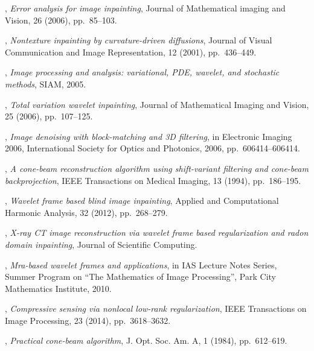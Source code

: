 \documentclass[letterpaper,10pt]{article}
\begin{document}
\begin{thebibliography}{10}
, {\em Error analysis for image inpainting},
  Journal of Mathematical imaging and Vision, 26 (2006), pp.~85--103.

, {\em Nontexture inpainting by curvature-driven
  diffusions}, Journal of Visual Communication and Image Representation, 12
  (2001), pp.~436--449.

\leavevmode\vrule height 2pt depth -1.6pt width 23pt, {\em Image processing and
  analysis: variational, PDE, wavelet, and stochastic methods}, SIAM, 2005.

, {\em {Total variation wavelet
  inpainting}}, Journal of Mathematical Imaging and Vision, 25 (2006),
  pp.~107--125.

, {\em Image denoising
  with block-matching and 3{D} filtering}, in Electronic Imaging 2006,
  International Society for Optics and Photonics, 2006, pp.~606414--606414.

, {\em A cone-beam reconstruction algorithm using
  shift-variant filtering and cone-beam backprojection}, IEEE Transactions on
  Medical Imaging, 13 (1994), pp.~186--195.

, {\em Wavelet frame based blind
  image inpainting}, Applied and Computational Harmonic Analysis, 32 (2012),
  pp.~268--279.

, {\em X-ray {CT} image reconstruction via
  wavelet frame based regularization and radon domain inpainting}, Journal of
  Scientific Computing.

, {\em Mra-based wavelet frames and applications}, in
  IAS Lecture Notes Series, Summer Program on ``The Mathematics of Image
  Processing'', Park City Mathematics Institute, 2010.

, {\em Compressive sensing via
  nonlocal low-rank regularization}, IEEE Transactions on Image Processing, 23
  (2014), pp.~3618--3632.

, {\em Practical cone-beam
  algorithm}, J. Opt. Soc. Am. A, 1 (1984), pp.~612--619.


\end{thebibliography}
\end{document}
